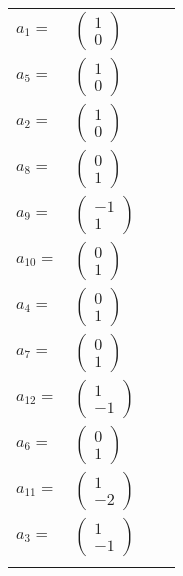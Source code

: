 \documentclass[1p]{elsarticle_modified}
\theoremstyle{definition}
\begin{document}
\begin{tabular}{m{7pt} m{180pt} m{7pt} m{180pt} }
\flushright $a_{1}=$&$\begin{pmatrix}1\\0\end{pmatrix}$ \\
\flushright $a_{5}=$&$\begin{pmatrix}1\\0\end{pmatrix}$ \\
\flushright $a_{2}=$&$\begin{pmatrix}1\\0\end{pmatrix}$ \\
\flushright $a_{8}=$&$\begin{pmatrix}0\\1\end{pmatrix}$ \\
\flushright $a_{9}=$&$\begin{pmatrix}-1\\1\end{pmatrix}$ \\
\flushright $a_{10}=$&$\begin{pmatrix}0\\1\end{pmatrix}$ \\
\flushright $a_{4}=$&$\begin{pmatrix}0\\1\end{pmatrix}$ \\
\flushright $a_{7}=$&$\begin{pmatrix}0\\1\end{pmatrix}$ \\
\flushright $a_{12}=$&$\begin{pmatrix}1\\-1\end{pmatrix}$ \\
\flushright $a_{6}=$&$\begin{pmatrix}0\\1\end{pmatrix}$ \\
\flushright $a_{11}=$&$\begin{pmatrix}1\\-2\end{pmatrix}$ \\
\flushright $a_{3}=$&$\begin{pmatrix}1\\-1\end{pmatrix}$\\&\end{tabular}
\end{document}
